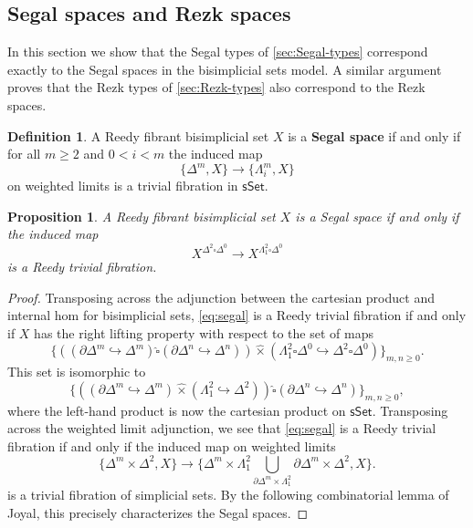 \documentclass{amsart}
\theoremstyle{plain}
\newtheorem{prop}[thm]{Proposition}
\theoremstyle{definition}
\newtheorem{defn}[thm]{Definition}
\theoremstyle{remark}
\numberwithin{equation}{section}
\newcommand{\sSet}{\mathsf{sSet}}
\begin{document}
\subsection{Segal spaces and Rezk spaces}

In this section we show that the Segal types of \cref{sec:Segal-types} correspond exactly to the Segal spaces in the bisimplicial sets model. A similar argument proves that the Rezk types of \cref{sec:Rezk-types} also correspond to the Rezk spaces. 

\begin{defn} A Reedy fibrant bisimplicial set $X$ is a \textbf{Segal space} if and only if for all $m \geq 2$ and $0 < i < m$ the induced map
\[ \{ \Delta^m,X\} \to \{\Lambda^m_i,X\}\] on weighted limits is a trivial fibration in $\sSet$.
\end{defn}



\begin{prop}\label{prop:joyal} A Reedy fibrant bisimplicial set $X$ is a Segal space if and only if the induced map
\begin{equation}\label{eq:segal} X^{\Delta^2 \square \Delta^0} \to X^{\Lambda^2_1 \square \Delta^0}\end{equation} is a Reedy trivial fibration.
\end{prop}
\begin{proof}
Transposing across the adjunction between the cartesian product and internal hom for bisimplicial sets, \eqref{eq:segal} is a Reedy trivial fibration if and only if $X$ has the right lifting property with respect to the set of maps
\[ \{ ( (\partial\Delta^m\hookrightarrow\Delta^m)\widehat{\square}(\partial\Delta^n\hookrightarrow\Delta^n)) \widehat{\times} (\Lambda^2_1 \square \Delta^0 \hookrightarrow \Delta^2 \square \Delta^0) \}_{m,n \geq 0}.\]
This set is isomorphic to
\[ \{ ( (\partial\Delta^m\hookrightarrow\Delta^m) \widehat{\times}(\Lambda^2_1\hookrightarrow\Delta^2))\widehat{\square}(\partial\Delta^n\hookrightarrow\Delta^n)  \}_{m,n \geq 0},\] where the left-hand product is now the cartesian product on $\sSet$. Transposing across the weighted limit adjunction, we see that \eqref{eq:segal} is a Reedy trivial fibration if and only if the induced map on weighted limits
\[ \{ \Delta^m \times \Delta^2, X\} \to \{ \Delta^m \times \Lambda^2_1 \bigcup\limits_{\partial\Delta^m\times \Lambda^2_1} \partial\Delta^m \times\Delta^2, X\}.\] is a trivial fibration of simplicial sets. By the following combinatorial lemma of Joyal, this precisely characterizes the Segal spaces.
\end{proof}
\end{document}
